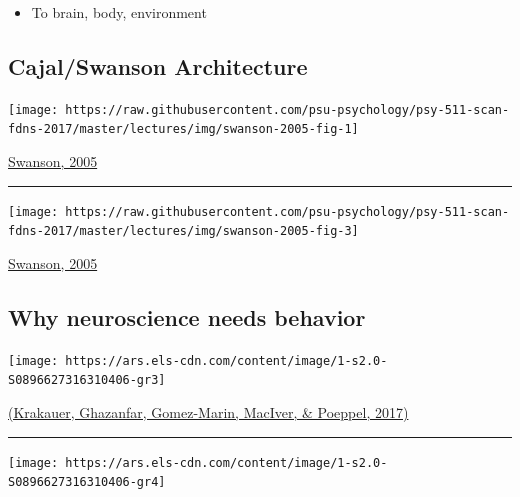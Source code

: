 \documentclass[]{article}
\providecommand{\tightlist}{%
  \setlength{\itemsep}{0pt}\setlength{\parskip}{0pt}}
\begin{document}
\begin{itemize}
\tightlist
\item
  To brain, body, environment
\end{itemize}

\hypertarget{cajalswanson-architecture}{%
\subsection{Cajal/Swanson
Architecture}\label{cajalswanson-architecture}}

\begin{center}\texttt{[image: https://raw.githubusercontent.com/psu-psychology/psy-511-scan-fdns-2017/master/lectures/img/swanson-2005-fig-1]} \end{center}

\href{http://dx.doi.org/10.1002/cne.20733}{Swanson, 2005}

\begin{center}\rule{0.5\linewidth}{\linethickness}\end{center}

\begin{center}\texttt{[image: https://raw.githubusercontent.com/psu-psychology/psy-511-scan-fdns-2017/master/lectures/img/swanson-2005-fig-3]} \end{center}

\href{http://dx.doi.org/10.1002/cne.20733}{Swanson, 2005}

\hypertarget{why-neuroscience-needs-behavior}{%
\subsection{Why neuroscience needs
behavior}\label{why-neuroscience-needs-behavior}}

\begin{center}\texttt{[image: https://ars.els-cdn.com/content/image/1-s2.0-S0896627316310406-gr3]} \end{center}

\href{http://dx.doi.org/10.1016/j.neuron.2016.12.041}{(Krakauer,
Ghazanfar, Gomez-Marin, MacIver, \& Poeppel, 2017)}

\begin{center}\rule{0.5\linewidth}{\linethickness}\end{center}

\begin{center}\texttt{[image: https://ars.els-cdn.com/content/image/1-s2.0-S0896627316310406-gr4]} \end{center}
\end{document}
